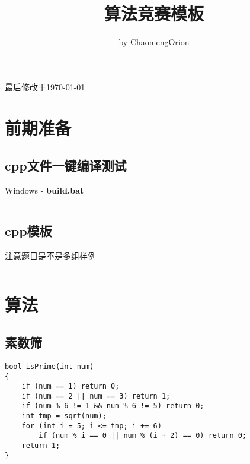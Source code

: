 \documentclass[a4paper, 10pt]{paper}
\newcommand{\cpp}[1]{\inputminted[frame=single, linenos=true]{cpp}{#1}}
\begin{document}
    \title{算法竞赛模板}
    \author{by ChaomengOrion}
    \maketitle
    {\color{cyan}最后修改于\underline{\today}}

    \tableofcontents

    \section{前期准备}
        \subsection{cpp文件一键编译测试}
        Windows - \textbf{build.bat}
        \inputminted[frame=single, linenos=true]{bat}{../build.bat}

        \subsection{cpp模板}
        注意题目是不是多组样例
        \cpp{../template.cpp}

    \section{算法}
        \subsection{素数筛}
        \begin{verbatim}
bool isPrime(int num)
{
    if (num == 1) return 0;
    if (num == 2 || num == 3) return 1;
    if (num % 6 != 1 && num % 6 != 5) return 0;
    int tmp = sqrt(num);
    for (int i = 5; i <= tmp; i += 6)
        if (num % i == 0 || num % (i + 2) == 0) return 0;
    return 1;
}
        \end{verbatim}
\end{document}
